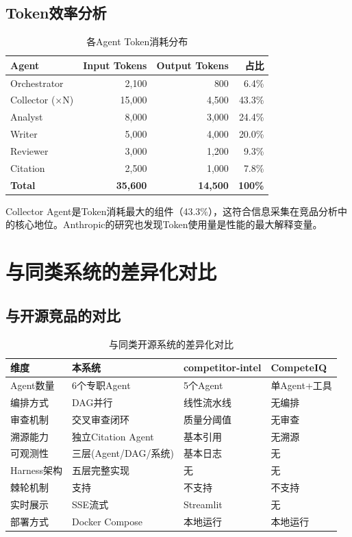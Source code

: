 \documentclass[12pt,a4paper]{ctexrep}
\begin{document}
\section{Token效率分析}

\begin{table}[H]
\centering
\caption{各Agent Token消耗分布}
\begin{tabular}{lrrr}
\toprule
\textbf{Agent} & \textbf{Input Tokens} & \textbf{Output Tokens} & \textbf{占比} \\
\midrule
Orchestrator & 2,100 & 800 & 6.4\% \\
Collector (×N) & 15,000 & 4,500 & 43.3\% \\
Analyst & 8,000 & 3,000 & 24.4\% \\
Writer & 5,000 & 4,000 & 20.0\% \\
Reviewer & 3,000 & 1,200 & 9.3\% \\
Citation & 2,500 & 1,000 & 7.8\% \\
\midrule
\textbf{Total} & \textbf{35,600} & \textbf{14,500} & \textbf{100\%} \\
\bottomrule
\end{tabular}
\end{table}

Collector Agent是Token消耗最大的组件（43.3\%），这符合信息采集在竞品分析中的核心地位。Anthropic的研究也发现Token使用量是性能的最大解释变量。

\chapter{与同类系统的差异化对比}

\section{与开源竞品的对比}

\begin{table}[H]
\centering
\caption{与同类开源系统的差异化对比}
\begin{tabularx}{\textwidth}{lXXX}
\toprule
\textbf{维度} & \textbf{本系统} & \textbf{competitor-intel} & \textbf{CompeteIQ} \\
\midrule
Agent数量 & 6个专职Agent & 5个Agent & 单Agent+工具 \\
编排方式 & DAG并行 & 线性流水线 & 无编排 \\
审查机制 & 交叉审查闭环 & 质量分阈值 & 无审查 \\
溯源能力 & 独立Citation Agent & 基本引用 & 无溯源 \\
可观测性 & 三层(Agent/DAG/系统) & 基本日志 & 无 \\
Harness架构 & 五层完整实现 & 无 & 无 \\
棘轮机制 & 支持 & 不支持 & 不支持 \\
实时展示 & SSE流式 & Streamlit & 无 \\
部署方式 & Docker Compose & 本地运行 & 本地运行 \\
\bottomrule
\end{tabularx}
\end{table}
\end{document}

